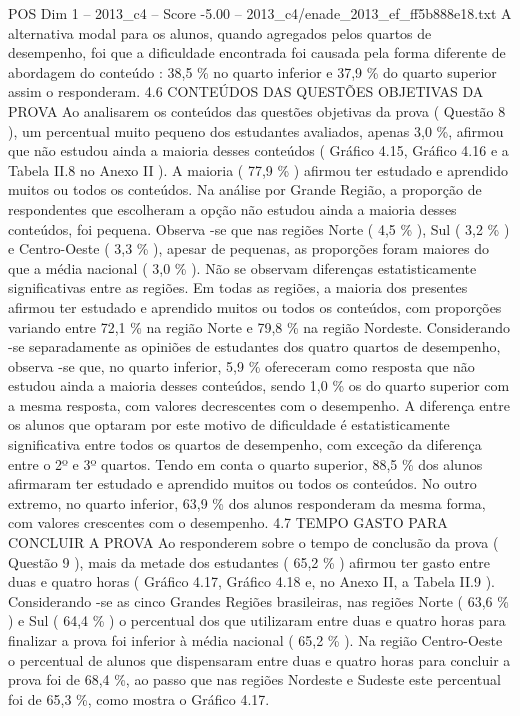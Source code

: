 \begin{textsample}{POS Dim 1 – 2013\_c4 – Score -5.00 – 2013\_c4/enade\_2013\_ef\_ff5b888e18.txt}
A alternativa modal para os alunos, quando agregados pelos quartos de desempenho, foi que a dificuldade encontrada foi causada pela forma diferente de abordagem do conteúdo : 38,5 \% no quarto inferior e 37,9 \% do quarto superior assim o responderam. 4.6 CONTEÚDOS DAS QUESTÕES OBJETIVAS DA PROVA Ao analisarem os conteúdos das questões objetivas da prova ( Questão 8 ), um percentual muito pequeno dos estudantes avaliados, apenas 3,0 \%, afirmou que não estudou ainda a maioria desses conteúdos ( Gráfico 4.15, Gráfico 4.16 e a Tabela II.8 no Anexo II ).
A maioria ( 77,9 \% ) afirmou ter estudado e aprendido muitos ou todos os conteúdos.
Na análise por Grande Região, a proporção de respondentes que escolheram a opção não estudou ainda a maioria desses conteúdos, foi pequena.
Observa -se que nas regiões Norte ( 4,5 \% ), Sul ( 3,2 \% ) e Centro-Oeste ( 3,3 \% ), apesar de pequenas, as proporções foram maiores do que a média nacional ( 3,0 \% ).
Não se observam diferenças estatisticamente significativas entre as regiões.
Em todas as regiões, a maioria dos presentes afirmou ter estudado e aprendido muitos ou todos os conteúdos, com proporções variando entre 72,1 \% na região Norte e 79,8 \% na região Nordeste.
Considerando -se separadamente as opiniões de estudantes dos quatro quartos de desempenho, observa -se que, no quarto inferior, 5,9 \% ofereceram como resposta que não estudou ainda a maioria desses conteúdos, sendo 1,0 \% os do quarto superior com a mesma resposta, com valores decrescentes com o desempenho.
A diferença entre os alunos que optaram por este motivo de dificuldade é estatisticamente significativa entre todos os quartos de desempenho, com exceção da diferença entre o 2º e 3º quartos.
Tendo em conta o quarto superior, 88,5 \% dos alunos afirmaram ter estudado e aprendido muitos ou todos os conteúdos.
No outro extremo, no quarto inferior, 63,9 \% dos alunos responderam da mesma forma, com valores crescentes com o desempenho. 4.7 TEMPO GASTO PARA CONCLUIR A PROVA Ao responderem sobre o tempo de conclusão da prova ( Questão 9 ), mais da metade dos estudantes ( 65,2 \% ) afirmou ter gasto entre duas e quatro horas ( Gráfico 4.17, Gráfico 4.18 e, no Anexo II, a Tabela II.9 ).
Considerando -se as cinco Grandes Regiões brasileiras, nas regiões Norte ( 63,6 \% ) e Sul ( 64,4 \% ) o percentual dos que utilizaram entre duas e quatro horas para finalizar a prova foi inferior à média nacional ( 65,2 \% ).
Na região Centro-Oeste o percentual de alunos que dispensaram entre duas e quatro horas para concluir a prova foi de 68,4 \%, ao passo que nas regiões Nordeste e Sudeste este percentual foi de 65,3 \%, como mostra o Gráfico 4.17.

\end{textsample}
